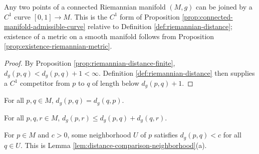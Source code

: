 \begin{proposition}
\label{prop:connected-manifold-c1-curve}





Any two points of a connected Riemannian manifold $(M,g)$ can be joined by a $C^1$ curve $[0,1]\to M$. This is the $C^1$ form of Proposition \ref{prop:connected-manifold-admissible-curve} relative to Definition \ref{def:riemannian-distance}; existence of a metric on a smooth manifold follows from Proposition \ref{prop:existence-riemannian-metric}.
\end{proposition}
\begin{proof}

\sketch By Proposition \ref{prop:riemannian-distance-finite}, $d_g(p,q)<d_g(p,q)+1<\infty$. Definition \ref{def:riemannian-distance} then supplies a $C^1$ competitor from $p$ to $q$ of length below $d_g(p,q)+1$.
\end{proof}

\begin{lemma}
\label{lem:riemannian-distance-symm}




For all $p,q\in M$, $d_g(p,q)=d_g(q,p)$.
\end{lemma}

\begin{lemma}
\label{lem:riemannian-distance-triangle}




For all $p,q,r\in M$, $d_g(p,r)\le d_g(p,q)+d_g(q,r)$.
\end{lemma}

\begin{lemma}
\label{lem:riemannian-distance-locally-small}




For $p\in M$ and $c>0$, some neighborhood $U$ of $p$ satisfies $d_g(p,q)<c$ for all $q\in U$. This is Lemma \ref{lem:distance-comparison-neighborhood}(a).
\end{lemma}

